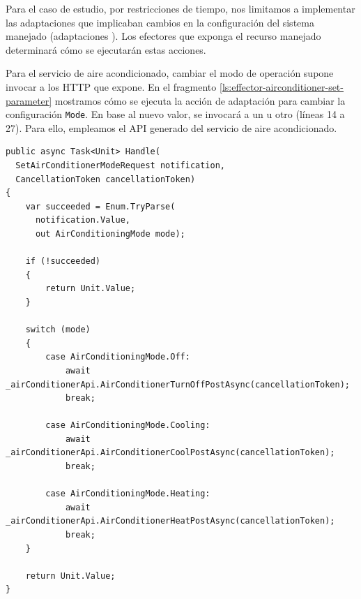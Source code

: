 Para el caso de estudio, por restricciones de tiempo, nos limitamos a implementar las adaptaciones que implicaban cambios en la configuración del sistema manejado (adaptaciones ). Los efectores que exponga el recurso manejado determinará cómo se ejecutarán estas acciones.

Para el servicio de aire acondicionado, cambiar el modo de operación supone invocar a los  HTTP que expone. En el fragmento \ref{ls:effector-airconditioner-set-parameter} mostramos cómo se ejecuta la acción de adaptación para cambiar la configuración \texttt{Mode}. En base al nuevo valor, se invocará a un  u otro (líneas 14 a 27). Para ello, empleamos el API  generado del servicio de aire acondicionado.

\begin{lstlisting}[caption={Implementación de los efectores del aire acondicionado. Invocan a los endpoints HTTP en base a las acciones de adaptación.\protect\footnotemark},captionpos=b, label=ls:effector-airconditioner-set-parameter]
public async Task<Unit> Handle(
  SetAirConditionerModeRequest notification,
  CancellationToken cancellationToken)
{
    var succeeded = Enum.TryParse(
      notification.Value,
      out AirConditioningMode mode);

    if (!succeeded)
    {
        return Unit.Value;
    }

    switch (mode)
    {
        case AirConditioningMode.Off:
            await _airConditionerApi.AirConditionerTurnOffPostAsync(cancellationToken);
            break;

        case AirConditioningMode.Cooling:
            await _airConditionerApi.AirConditionerCoolPostAsync(cancellationToken);
            break;

        case AirConditioningMode.Heating:
            await _airConditionerApi.AirConditionerHeatPostAsync(cancellationToken);
            break;
    }

    return Unit.Value;
}
\end{lstlisting}

